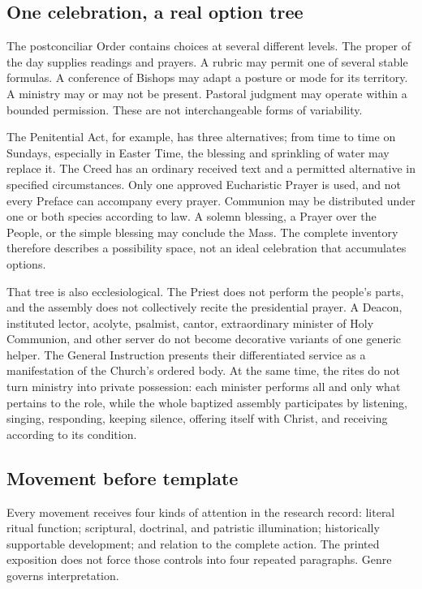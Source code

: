{\subsection{One celebration, a real option tree}

The postconciliar Order contains choices at several different levels. The proper of the day supplies readings and prayers. A rubric may permit one of several stable formulas. A conference of Bishops may adapt a posture or mode for its territory. A ministry may or may not be present. Pastoral judgment may operate within a bounded permission. These are not interchangeable forms of variability.

The Penitential Act, for example, has three alternatives; from time to time on Sundays, especially in Easter Time, the blessing and sprinkling of water may replace it. The Creed has an ordinary received text and a permitted alternative in specified circumstances. Only one approved Eucharistic Prayer is used, and not every Preface can accompany every prayer. Communion may be distributed under one or both species according to law. A solemn blessing, a Prayer over the People, or the simple blessing may conclude the Mass. The complete inventory therefore describes a possibility space, not an ideal celebration that accumulates options.

That tree is also ecclesiological. The Priest does not perform the people's parts, and the assembly does not collectively recite the presidential prayer. A Deacon, instituted lector, acolyte, psalmist, cantor, extraordinary minister of Holy Communion, and other server do not become decorative variants of one generic helper. The General Instruction presents their differentiated service as a manifestation of the Church's ordered body. At the same time, the rites do not turn ministry into private possession: each minister performs all and only what pertains to the role, while the whole baptized assembly participates by listening, singing, responding, keeping silence, offering itself with Christ, and receiving according to its condition.

\subsection{Movement before template}

Every movement receives four kinds of attention in the research record: literal ritual function; scriptural, doctrinal, and patristic illumination; historically supportable development; and relation to the complete action. The printed exposition does not force those controls into four repeated paragraphs. Genre governs interpretation.

}
